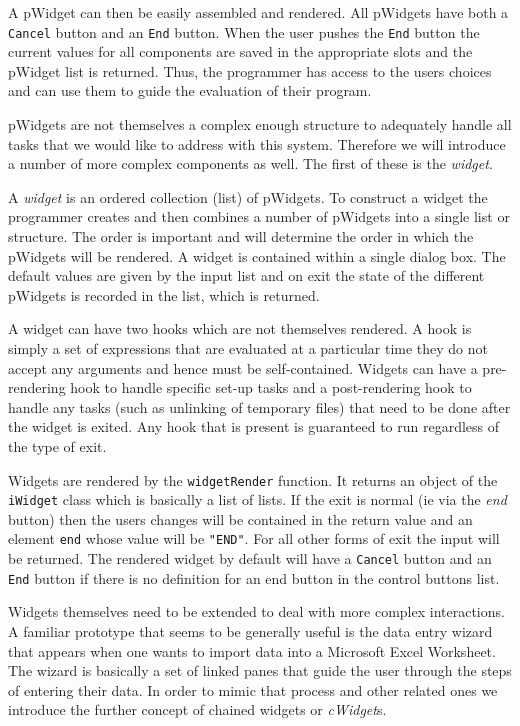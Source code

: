 \documentclass{article}
\begin{document}
A pWidget can then be easily assembled and rendered. 
All pWidgets have both a \verb+Cancel+ button and an \verb+End+
button. When the user pushes the \verb+End+ button the current values
for all components are saved in the appropriate slots and the pWidget
list is returned. Thus, the programmer has access to the users choices
and can use them to guide the evaluation of their program.

pWidgets are not themselves a complex enough structure to adequately
handle all tasks that we would like to address with this
system. Therefore we will introduce a number of more complex
components as well.
The first of these is the {\em widget}.

A {\em widget} is an ordered collection (list) of pWidgets.
To construct a widget the programmer creates and then combines a
number of pWidgets into a single list or structure. The order is
important and will determine the order in which the pWidgets will be
rendered.
A widget is contained within a single dialog box.
The default values are given by the input list and on exit the state
of the different pWidgets is recorded in the list, which is returned.

A widget can have two hooks which are not themselves rendered. 
A hook is simply a set of expressions that are evaluated at a
particular time they do not accept any arguments and hence must be
self-contained. 
Widgets can have a pre-rendering hook to handle specific set-up tasks
and a post-rendering hook to handle any tasks (such as unlinking of
temporary files) that need to be done after the widget is exited.
Any hook that is present is guaranteed to run regardless of the type
of exit.

Widgets are rendered by the \verb+widgetRender+ function.
It returns an object of the \verb+iWidget+ class which is basically a
list of lists. If the exit is normal (ie via the {\em end} button)
then the users changes will be contained in the return value and an
element {\tt end} whose value will be {\tt "END"}. 
For all other forms of exit the input
will be returned. The rendered widget by default will have a
\verb+Cancel+ button and an \verb+End+ button if there is no
definition for an end button in the control buttons list. 

Widgets themselves need to be extended to deal with more complex
interactions. A familiar prototype that seems to be generally useful
is the data entry wizard that appears when one wants to import data
into a Microsoft Excel Worksheet. The wizard is basically a set of
linked panes that guide the user through the steps of entering their
data. In order to mimic that process and other related ones we
introduce the further concept of chained widgets or {\em cWidget}s.
\end{document}
